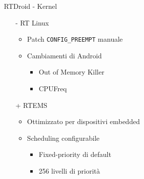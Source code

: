 \begin{frame}{RTDroid - Kernel}
	\begin{itemize}
		\item[-] RT Linux
		\begin{itemize}
			\item Patch \texttt{CONFIG\_PREEMPT} manuale
			\item Cambiamenti di Android
			\begin{itemize}
				\item Out of Memory Killer
				\item CPUFreq
			\end{itemize}
		\end{itemize}
		\item[+] RTEMS
		\begin{itemize}
			\item Ottimizzato per dispositivi embedded
			\item Scheduling configurabile
			\begin{itemize}
				\item Fixed-priority di default
				\item 256 livelli di priorità
			\end{itemize}
		\end{itemize}
	\end{itemize}
\end{frame}
